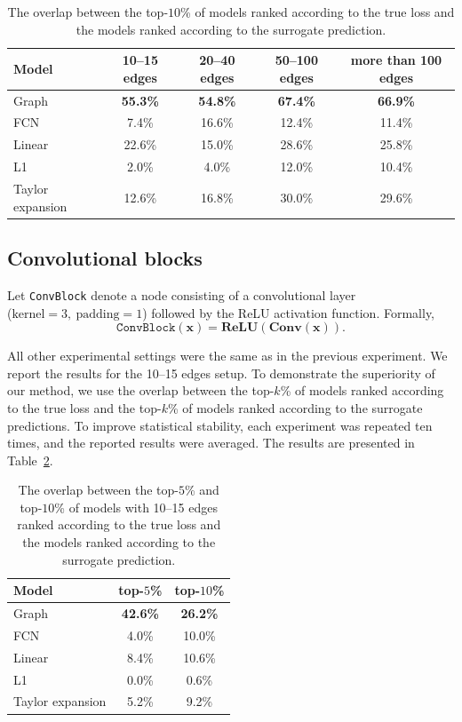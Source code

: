 \documentclass[runningheads]{llncs}
\begin{document}
\begin{table}[H]
\caption{The overlap between the top-$10$\% of models ranked according to the true loss and the models ranked according to the surrogate prediction.}
\label{results_top10}
\centering
\begin{tabular}{|l|c|c|c|c|}
\hline
\bfseries Model & 10--15 edges & 20--40 edges & 50--100 edges & more than 100 edges \\
\hline
Graph  & \textbf{55.3\%} & \textbf{54.8\%} & \textbf{67.4\%} & \textbf{66.9\%} \\
FCN & 7.4\% & 16.6\% & 12.4\% & 11.4\% \\
Linear & 22.6\% & 15.0\% & 28.6\% & 25.8\% \\
L1 & 2.0\% & 4.0\% & 12.0\% & 10.4\% \\
Taylor expansion & 12.6\% & 16.8\% & 30.0\% & 29.6\% \\
\hline
\end{tabular}
\end{table}

\subsection{Convolutional blocks}

Let \texttt{ConvBlock} denote a node consisting of a convolutional layer\\($\text{kernel}=3,\ \text{padding} = 1$) followed by the ReLU activation function.
Formally,
\begin{equation}
\texttt{ConvBlock}(\mathbf{x}) = \textbf{ReLU}(\textbf{Conv}(\mathbf{x})).
\end{equation}

All other experimental settings were the same as in the previous experiment.
We report the results for the 10--15 edges setup.
To demonstrate the superiority of our method, we use the overlap between the top-$k$\% of models ranked according to the true loss and the top-$k$\% of models ranked according to the surrogate predictions.
To improve statistical stability, each experiment was repeated ten times, and the reported results were averaged.
The results are presented in Table~\ref{results_top_conv}.

\begin{table}[H]
\caption{The overlap between the top-$5$\% and top-$10$\% of models with 10--15 edges ranked according to the true loss and the models ranked according to the surrogate prediction.}
\label{results_top_conv}
\centering
\begin{tabular}{|l|c|c|}
\hline
\bfseries Model & top-$5$\% & top-$10$\% \\
\hline
Graph  & \textbf{42.6\%} & \textbf{26.2\%} \\
FCN & 4.0\% & 10.0\% \\
Linear & 8.4\% & 10.6\% \\
L1 & 0.0\% & 0.6\% \\
Taylor expansion & 5.2\% & 9.2\% \\
\hline
\end{tabular}
\end{table}
\end{document}
